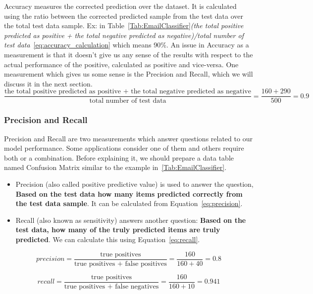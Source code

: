 Accuracy measures the corrected prediction over the dataset. It is calculated using the ratio between the corrected predicted sample from the test data over the total test data sample. Ex: in Table~\ref{Tab:EmailClassifier}\textit{(the total positive predicted as positive + the total negative predicted as negative)/total number of test data}~\eqref{eq:accuracy_calculation} which means 90\%. An issue in Accuracy as a measurement is that it doesn’t give us any sense of the results with respect to the actual performance of the positive, calculated as positive and vice-versa. One measurement which gives us some sense is the Precision and Recall, which we will discuss it in the next section.%
\begin{equation}\label{eq:accuracy_calculation}
\frac{\text{the total positive predicted as positive + the total negative predicted as negative}}{\text{total number of test data}} = \frac{160+290}{500}=0.9 
\end{equation}%


\subsubsection{Precision and Recall}

Precision and Recall are two measurements which answer questions related to our model performance. Some applications consider one of them and others require both or a combination. Before explaining it, we should prepare a data table named Confusion Matrix similar to the example in~\ref{Tab:EmailClassifier}.

\begin{itemize}
\item Precision (also called positive predictive value) is used to answer the question, \textbf{Based on the test data how many items predicted correctly from the test data sample}. It can be calculated from Equation~\eqref{eq:precision}.
\item Recall (also known as sensitivity) answers another question: \textbf{Based on the test data, how many of the truly predicted items are truly predicted}. We can calculate this using Equation~\eqref{eq:recall}.
\end{itemize}
\begin{equation}\label{eq:precision}
precision = \frac{\text{true positives}}{\text{true positives + false positives}} = \frac{160}{160 + 40}=0.8
\end{equation}%


\begin{equation}\label{eq:recall}
recall = \frac{\text{true positives}}{\text{true positives + false negatives}} = \frac{160}{160 + 10}=0.941
\end{equation}%

